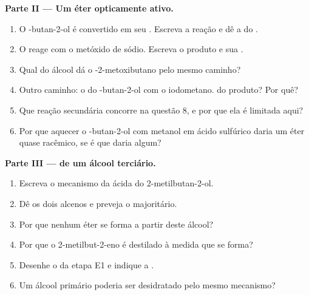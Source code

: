 \begin{problem}
\medskip
\noindent\textbf{Parte II --- Um éter opticamente ativo.}
\begin{enumerate}[resume]
  \item O -butan-2-ol é convertido em seu . Escreva a
        reação e dê a  do .
  \item O  reage com o metóxido de sódio. Escreva o produto e
        sua .
  \item Qual  do álcool dá o -2-metoxibutano pelo
        mesmo caminho?
  \item Outro caminho: o  do -butan-2-ol com o
        iodometano.  do produto? Por quê?
  \item Que reação secundária concorre na questão 8, e por que ela é
        limitada aqui?
  \item Por que aquecer o -butan-2-ol com metanol em ácido
        sulfúrico daria um éter quase racêmico, se é que daria algum?
\end{enumerate}

\medskip
\noindent\textbf{Parte III ---  de um álcool terciário.}
\begin{enumerate}[resume]
  \item Escreva o mecanismo da  ácida do
        2-metilbutan-2-ol.
  \item Dê os dois alcenos e preveja o majoritário.
  \item Por que nenhum éter se forma a partir deste álcool?
  \item Por que o 2-metilbut-2-eno é destilado à medida que se forma?
  \item Desenhe o  da etapa E1 e indique a .
  \item Um álcool primário poderia ser desidratado pelo mesmo mecanismo?
\end{enumerate}


\end{problem}
